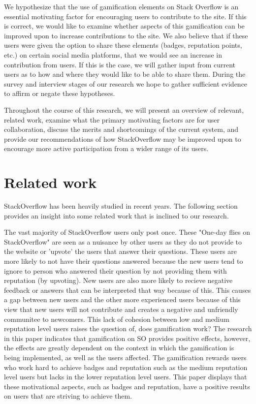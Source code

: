 \documentclass{sigchi}
\begin{document}
We hypothesize that the use of gamification elements on Stack Overflow is an essential motivating factor for encouraging users to contribute to the site. If this is correct, we would like to examine whether aspects of this gamification can be improved upon to increase contributions to the site. We also believe that if these users were given the option to share these elements (badges, reputation points, etc.) on certain social media platforms, that we would see an increase in contribution from users. If this is the case, we will gather input from current users as to how and where they would like to be able to share them. During the survey and interview stages of our research we hope to gather sufficient evidence to affirm or negate these hypotheses.


Throughout the course of this research, we will present an overview of relevant, related work, examine what the primary motivating factors are for user collaboration, discuss the merits and shortcomings of the current system, and provide our recommendations of how StackOverflow may be improved upon to encourage more active participation from a wider range of its users.

\section{Related work}
StackOverflow has been heavily studied in recent years. The following section provides an insight into some related work that is inclined to our research.

The vast majority of StackOverflow users only post once. These "One-day flies on StackOverflow" are seen as a nuisance by other users as they do not provide to the website or 'upvote' the users that answer their questions. \cite{Slag} These users are more likely to not have their questions answered because the new users tend to ignore to person who answered their question by not providing them with reputation (by upvoting). New users are also more likely to recieve negative feedback or answers that can be interpreted that way because of this. This causes a gap between new users and the other more experienced users because of this view that new users will not contribute and creates a negative and unfriendly communitee to newcomers. This lack of cohesion between low and medium reputation level users raises the question of, does gamification work? \cite{Hamari} The research in this paper indicates that gamification on SO provides positive effects, however, the effects are greatly dependent on the context in which the gamification is being implemented, as well as the users affected. The gamification rewards users who work hard to achieve badges and reputation such as the medium reputation level users but lacks in the lower reputation level users. This paper displays that these motivational aspects, such as badges and reputation, have a positive results on users that are striving to achieve them.
\end{document}
